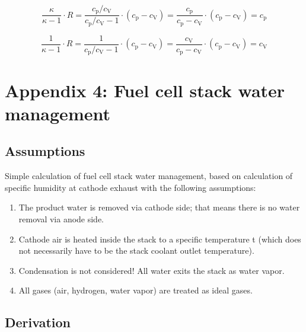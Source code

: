 \documentclass[11pt,a4paper,english,twoside]{scrreprt}
\begin{document}
\[\frac{\kappa }{\kappa -1} \cdot R=\frac{c_\text{p}/c_\text{V}}{c_\text{p}/c_\text{V}-1} \cdot \left(c_\text{p} -c_\text{V} \right)
=\frac{c_\text{p}}{c_\text{p} - c_\text{V}} \cdot \left(c_\text{p} - c_\text{V} \right)=c_\text{p} \]

\[\frac{1}{\kappa -1} \cdot R=\frac{1}{c_\text{p}/c_\text{V}-1} \cdot \left(c_\text{p} - c_\text{V} \right)
=\frac{c_\text{V}}{c_\text{p} - c_\text{V}} \cdot \left(c_\text{p} - c_\text{V} \right)=c_\text{V} \]



\chapter{Appendix 4: Fuel cell stack water management}
\label{chap:Fuel cell stack water management}

\section{Assumptions}

Simple calculation of fuel cell stack water management, based on calculation of specific humidity at cathode exhaust with the following assumptions:

\begin{enumerate}
\item The product water is removed via cathode side; that means there is no water removal via anode side.

\item Cathode air is heated inside the stack to a specific temperature t (which does not necessarily have to be the stack coolant outlet temperature).

\item Condensation is not considered! All water exits the stack as water vapor.

\item All gases (air, hydrogen, water vapor) are treated as ideal gases.

\end{enumerate}


\section{Derivation}
\end{document}
